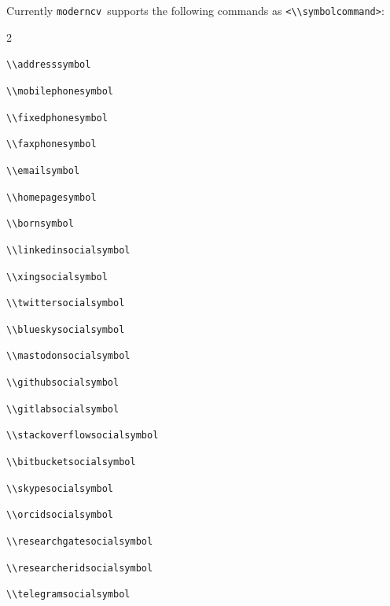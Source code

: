 \documentclass[a4paper, 11pt]{article}
\newcommand{\code}[1]{\lstinline!#1!}
\newcommand{\moderncv}{\code{moderncv}}
\newcommand{\Moderncv}{\moderncv~}
\begin{document}
Currently \Moderncv supports the following commands as \code{<\\symbolcommand>}:
\begin{itemize}
  \begin{multicols}{2}
    \item \code{\\addresssymbol}
    \item \code{\\mobilephonesymbol}
    \item \code{\\fixedphonesymbol}
    \item \code{\\faxphonesymbol}
    \item \code{\\emailsymbol}
    \item \code{\\homepagesymbol}
    \item \code{\\bornsymbol}
    \item \code{\\linkedinsocialsymbol}
    \item \code{\\xingsocialsymbol}
    \item \code{\\twittersocialsymbol}
    \item \code{\\blueskysocialsymbol}
    \item \code{\\mastodonsocialsymbol}
    \item \code{\\githubsocialsymbol}
    \item \code{\\gitlabsocialsymbol}
    \item \code{\\stackoverflowsocialsymbol}
    \item \code{\\bitbucketsocialsymbol}
    \item \code{\\skypesocialsymbol}
    \item \code{\\orcidsocialsymbol}
    \item \code{\\researchgatesocialsymbol}
    \item \code{\\researcheridsocialsymbol}
    \item \code{\\telegramsocialsymbol}

\end{multicols}
\end{itemize}
\end{document}
